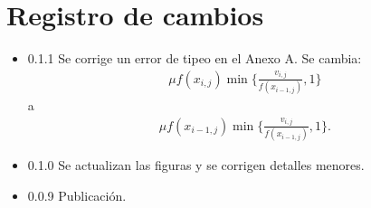 \section{Registro de cambios}
\begin{itemize}
	\item{0.1.1} Se corrige un error de tipeo en el Anexo A. Se cambia:
	\begin{align*}
	\mu f(x_{i,j}) \min\{\frac{v_{i,j}}{f(x_{i-1,j})},1\}
	\end{align*}
	\noindent a
	\begin{align*}
	\mu f(x_{i-1,j}) \min\{\frac{v_{i,j}}{f(x_{i-1,j})},1\}.
	\end{align*}
	\item{0.1.0} Se actualizan las figuras y se corrigen detalles menores.
	\item{0.0.9} Publicación.
\end{itemize}